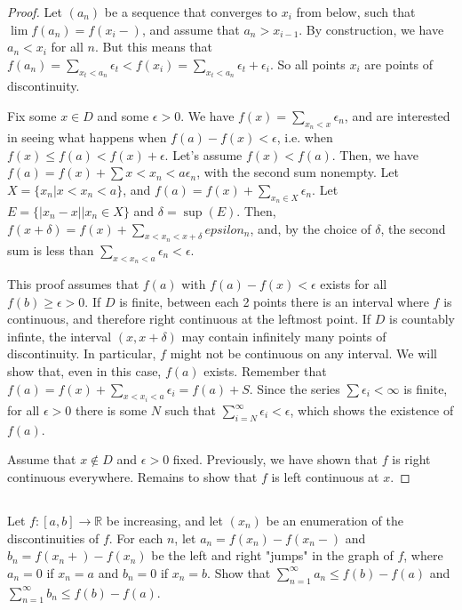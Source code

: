 \begin{proof}
Let $(a_n)$ be a sequence that converges to $x_i$ from below, such that $\lim f(a_n) = f(x_i-)$, and assume that $a_n > x_{i-1}$. By construction, we have $a_n < x_i$ for all $n$. But this means that $f(a_n) = \sum_{x_t<a_n} \epsilon_t < f(x_i) = \sum_{x_t<a_n} \epsilon_t + \epsilon_i$. So all points $x_i$ are points of discontinuity.

\vspace{1em}




Fix some $x \in D$ and some $\epsilon>0$. We have $f(x) = \sum_{x_n<x} \epsilon_n$, and are interested in seeing what happens when $f(a) - f(x) < \epsilon$, i.e. when $f(x) \leq f(a) < f(x) + \epsilon$. Let's assume $f(x) < f(a)$. Then, we have $f(a) = f(x) + \sum{x<x_n<a} \epsilon_n$, with the second sum nonempty. Let $X = \{x_n | x < x_n < a\}$, and $f(a) = f(x) + \sum_{x_n \in X} \epsilon_n$. Let $E = \{|x_n - x| | x_n \in X\}$ and $\delta=\sup(E)$. Then,  $f(x+\delta) = f(x) + \sum_{x<x_n<x+\delta}epsilon_n$, and, by the choice of $\delta$, the second sum is less than $\sum_{x<x_n<a} \epsilon_n < \epsilon$.

This proof assumes that $f(a)$ with $f(a) - f(x) < \epsilon$ exists for all $f(b) \geq \epsilon > 0$. If $D$ is finite, between each 2 points there is an interval where $f$ is continuous, and therefore right continuous at the leftmost point. If $D$ is countably infinte, the interval $(x, x+\delta)$ may contain infinitely many points of discontinuity. In particular, $f$ might not be continuous on any interval. We will show that, even in this case, $f(a)$ exists. Remember that $f(a) = f(x) + \sum_{x<x_i<a}\epsilon_i = f(a) + S$. Since the series $\sum \epsilon_i < \infty$ is finite, for all $\epsilon > 0$ there is some $N$ such that $\sum_{i=N}^\infty \epsilon_i < \epsilon$, which shows the existence of $f(a)$.


\vspace{1em}

Assume that $x \notin D$ and $\epsilon > 0$ fixed. Previously, we have shown that $f$ is right continuous everywhere. Remains to show that $f$ is left continuous at $x$. 



\end{proof}

\subsection{} Let $f : [a, b] \rightarrow \mathbb{R}$ be increasing, and let $(x_n)$ be an enumeration of the discontinuities of $f$. For each $n$, let $a_n = f(x_n)-f(x_n-)$ and $b_n = f(x_n+)-f(x_n)$ be the left and right "jumps" in the graph of $f$, where $a_n = 0$ if $x_n = a$ and $b_n = 0$ if $x_n = b$. Show that $\sum_{n=1}^\infty a_n \leq f(b)-f(a)$ and $\sum_{n=1}^\infty b_n \leq f(b)-f(a)$. 

